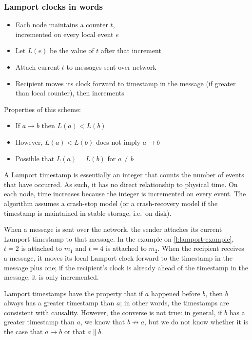 \begin{frame}
    \label{s:lamport-description}
    \frametitle{Lamport clocks in words}
    \begin{itemize}
        \item Each node maintains a counter $t$,\\incremented on every local event $e$
        \item Let $L(e)$ be the value of $t$ after that increment
        \item Attach current $t$ to messages sent over network
        \item Recipient moves its clock forward to timestamp in the message (if greater than local counter), then increments\\[1em]
    \end{itemize}\pause
    Properties of this scheme:
    \begin{itemize}
        \item If $a \rightarrow b$ then $L(a) < L(b)$\pause
        \item However, $L(a) < L(b)$ does not imply $a \rightarrow b$\pause
        \item Possible that $L(a) = L(b)$ for $a \neq b$
    \end{itemize}
\end{frame}
\label{l:lamport-description}

A Lamport timestamp is essentially an integer that counts the number of events that have occurred.
As such, it has no direct relationship to physical time.
On each node, time increases because the integer is incremented on every event.
The algorithm assumes a crash-stop model (or a crash-recovery model if the timestamp is maintained in stable storage, i.e.\ on disk).

When a message is sent over the network, the sender attaches its current Lamport timestamp to that message.
In the example on \autoref{l:lamport-example}, $t=2$ is attached to $m_1$ and $t=4$ is attached to $m_2$.
When the recipient receives a message, it moves its local Lamport clock forward to the timestamp in the message plus one; if the recipient's clock is already ahead of the timestamp in the message, it is only incremented.

Lamport timestamps have the property that if $a$ happened before $b$, then $b$ always has a greater timestamp than $a$; in other words, the timestamps are consistent with causality.
However, the converse is not true: in general, if $b$ has a greater timestamp than $a$, we know that $b \not\rightarrow a$, but we do not know whether it is the case that $a \rightarrow b$ or that $a \parallel b$.

